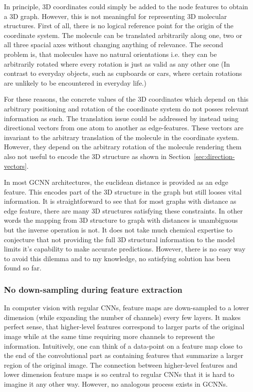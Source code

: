 In principle, 3D coordinates could simply be added to the node features to obtain a 3D graph. However, this is not meaningful for representing 3D molecular structures. First of all, there is no logical reference point for the origin of the coordinate system. The molecule can be translated arbitrarily along one, two or all three spacial axes without changing anything of relevance. The second problem is, that molecules have no natural orientations i.e. they can be arbitrarily rotated where every rotation is just as valid as any other one (In contrast to everyday objects, such as cupboards or cars, where certain rotations are unlikely to be encountered in everyday life.)

For these reasons, the concrete values of the 3D coordinates which depend on this arbitrary positioning and rotation of the coordinate system do not posses relevant information as such. The translation issue could be addressed by instead using directional vectors from one atom to another as edge-features. These vectors are invariant to the arbitrary translation of the molecule in the coordinate system. However, they depend on the arbitrary rotation of the molecule rendering them also not useful to encode the 3D structure as shown in Section~\ref{sec:direction-vectors}.

In most GCNN architectures, the euclidean distance is provided as an edge feature. This encodes part of the 3D structure in the graph but still looses vital information. It is straightforward to see that for most graphs with distance as edge feature, there are many 3D structures satisfying these constraints. In other words the mapping from 3D structure to graph with distances is unambiguous but the inverse operation is not. It does not take much chemical expertise to conjecture that not providing the full 3D structural information to the model limits it's capability to make accurate predictions. However, there is no easy way to avoid this dilemma and to my knowledge, no satisfying solution has been found so far.


\subsubsection{No down-sampling during feature extraction}

In computer vision with regular CNNs, feature maps are down-sampled to a lower dimension (while expanding the number of channels) every few layers. It makes perfect sense, that higher-level features correspond to larger parts of the original image while at the same time requiring more channels to represent the information. Intuitively, one can think of a data-point on a feature map close to the end of the convolutional part as containing features that summarize a larger region of the original image. The connection between higher-level features and lower dimension feature maps is so central to regular CNNs that it is hard to imagine it any other way. However, no analogous process exists in GCNNs.

